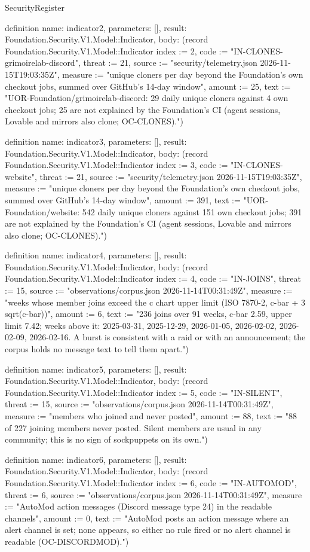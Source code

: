 \begin{lexlean}{SecurityRegister}
\begin{semanticmodule}
definition{
  name: indicator2,
  parameters: [],
  result: Foundation.Security.V1.Model::Indicator,
  body: (record Foundation.Security.V1.Model::Indicator {index := 2, code := "IN-CLONES-grimoirelab-discord", threat := 21, source := "security/telemetry.json 2026-11-15T19:03:35Z", measure := "unique cloners per day beyond the Foundation's own checkout jobs, summed over GitHub's 14-day window", amount := 25, text := "UOR-Foundation/grimoirelab-discord: 29 daily unique cloners against 4 own checkout jobs; 25 are not explained by the Foundation's CI (agent sessions, Lovable and mirrors also clone; OC-CLONES)."})
}

definition{
  name: indicator3,
  parameters: [],
  result: Foundation.Security.V1.Model::Indicator,
  body: (record Foundation.Security.V1.Model::Indicator {index := 3, code := "IN-CLONES-website", threat := 21, source := "security/telemetry.json 2026-11-15T19:03:35Z", measure := "unique cloners per day beyond the Foundation's own checkout jobs, summed over GitHub's 14-day window", amount := 391, text := "UOR-Foundation/website: 542 daily unique cloners against 151 own checkout jobs; 391 are not explained by the Foundation's CI (agent sessions, Lovable and mirrors also clone; OC-CLONES)."})
}

definition{
  name: indicator4,
  parameters: [],
  result: Foundation.Security.V1.Model::Indicator,
  body: (record Foundation.Security.V1.Model::Indicator {index := 4, code := "IN-JOINS", threat := 15, source := "observations/corpus.json 2026-11-14T00:31:49Z", measure := "weeks whose member joins exceed the c chart upper limit (ISO 7870-2, c-bar + 3 sqrt(c-bar))", amount := 6, text := "236 joins over 91 weeks, c-bar 2.59, upper limit 7.42; weeks above it: 2025-03-31, 2025-12-29, 2026-01-05, 2026-02-02, 2026-02-09, 2026-02-16. A burst is consistent with a raid or with an announcement; the corpus holds no message text to tell them apart."})
}

definition{
  name: indicator5,
  parameters: [],
  result: Foundation.Security.V1.Model::Indicator,
  body: (record Foundation.Security.V1.Model::Indicator {index := 5, code := "IN-SILENT", threat := 15, source := "observations/corpus.json 2026-11-14T00:31:49Z", measure := "members who joined and never posted", amount := 88, text := "88 of 227 joining members never posted. Silent members are usual in any community; this is no sign of sockpuppets on its own."})
}

definition{
  name: indicator6,
  parameters: [],
  result: Foundation.Security.V1.Model::Indicator,
  body: (record Foundation.Security.V1.Model::Indicator {index := 6, code := "IN-AUTOMOD", threat := 6, source := "observations/corpus.json 2026-11-14T00:31:49Z", measure := "AutoMod action messages (Discord message type 24) in the readable channels", amount := 0, text := "AutoMod posts an action message where an alert channel is set; none appears, so either no rule fired or no alert channel is readable (OC-DISCORDMOD)."})
}


\end{semanticmodule}
\end{lexlean}
